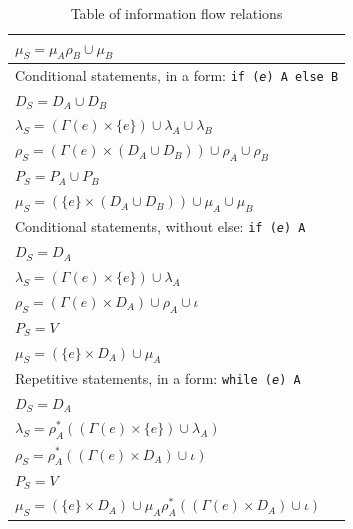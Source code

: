\documentclass[oneside,12pt,a4paper]{book}
\begin{document}
\begin{table}[t]
\begin{tabular}{l}
$\mu_S = \mu_A\rho_B \cup \mu_B$                                                            \\
\hline                                                                                      
Conditional statements, in a form: \texttt{if (\textit{e}) A else B}                        \\
$D_S = D_A \cup D_B$                                                                        \\
$\lambda_S = (\Gamma(e) \times \{e\}) \cup \lambda_A \cup \lambda_B$                        \\
$\rho_S = (\Gamma(e) \times (D_A \cup D_B)) \cup \rho_A \cup \rho_B$                        \\
$P_S = P_A \cup P_B$                                                                        \\
$\mu_S = (\{e\} \times (D_A \cup D_B)) \cup \mu_A \cup \mu_B$                               \\
\hline                                                                                      
Conditional statements, without else: \texttt{if (\textit{e}) A}                            \\
$D_S = D_A$                                                                                 \\
$\lambda_S = (\Gamma(e) \times \{e\}) \cup \lambda_A$                                       \\
$\rho_S = (\Gamma(e) \times D_A) \cup \rho_A \cup \iota$                                    \\
$P_S = V$                                                                                   \\
$\mu_S = (\{e\} \times D_A) \cup \mu_A$                                                     \\
\hline                                                                                      
Repetitive statements, in a form: \texttt{while (\textit{e}) A}                             \\
$D_S = D_A$                                                                                 \\
$\lambda_S = \rho^*_A((\Gamma(e) \times \{e\}) \cup \lambda_A)$                   \\
$\rho_S = \rho^*_A((\Gamma(e) \times D_A) \cup \iota)$                            \\
$P_S = V$                                                                                   \\
$\mu_S = (\{e\} \times D_A) \cup \mu_A\rho^*_A((\Gamma(e) \times D_A) \cup \iota)$\\
  \end{tabular}
  \caption{Table of information flow relations}
  \label{tab:informationFlowTable}
\end{table}
\end{document}

